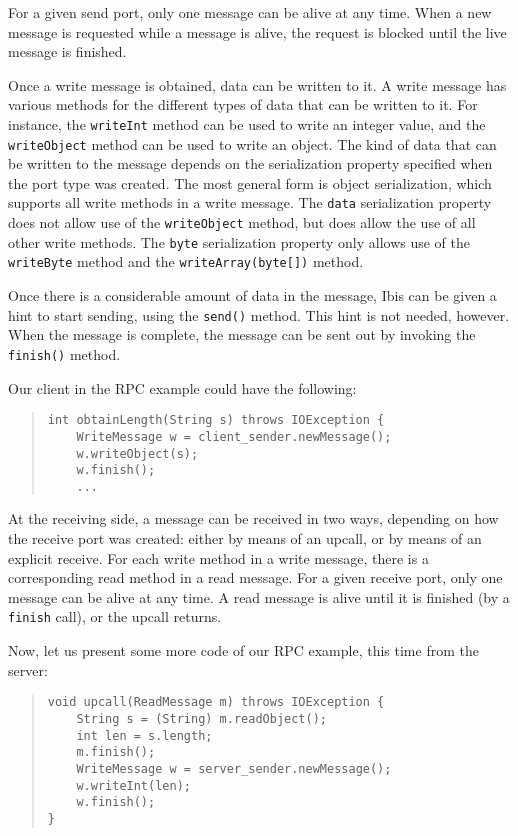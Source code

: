 \documentclass[10pt]{article}
\begin{document}
For a given send port, only one message can be alive at any time.
When a new message is requested while a message is alive, the request
is blocked until the live message is finished.

Once a write message is obtained, data can be written to it.
A write message has various methods for the different types of
data that can be written to it. For instance, the
\verb+writeInt+ method can be used to write an integer value,
and the \verb+writeObject+ method can be used to write an object.
The kind of data that can be written to the message depends on the
serialization property specified when the port type was created.
The most general form is object serialization, which supports 
all write methods in a write message.
The \verb+data+ serialization property does not allow use of the
\verb+writeObject+ method, but does allow the use of all other write
methods. The \verb+byte+ serialization property only allows use
of the \verb+writeByte+ method and the \verb+writeArray(byte[])+
method.

Once there is a considerable amount of data in the message, Ibis
can be given a hint to start sending, using the \verb+send()+
method. This hint is not needed, however. When the message is
complete, the message can be sent out by invoking the
\verb+finish()+ method.

Our client in the RPC example could have the following:
\begin{quote}
\begin{verbatim}
int obtainLength(String s) throws IOException {
    WriteMessage w = client_sender.newMessage();
    w.writeObject(s);
    w.finish();
    ...
\end{verbatim}
\end{quote}

At the receiving side, a message can be received in two ways,
depending on how the receive port was created: either by means of an
upcall, or by means of an explicit receive. For each write method
in a write message, there is a corresponding read method in
a read message. For a given receive port, only one message can
be alive at any time. A read message is alive until it is
finished (by a \verb+finish+ call), or the upcall returns.

Now, let us present some more code of our RPC example, this time
from the server:

\begin{quote}
\begin{verbatim}
void upcall(ReadMessage m) throws IOException {
    String s = (String) m.readObject();
    int len = s.length;
    m.finish();
    WriteMessage w = server_sender.newMessage();
    w.writeInt(len);
    w.finish();
}
\end{verbatim}
\end{quote}
\end{document}
